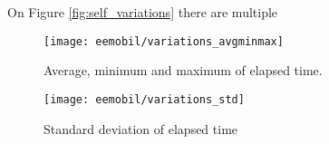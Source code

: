 		On Figure \ref{fig:self_variations} there are multiple 
		\begin{figure}
			\centering
			\texttt{[image: eemobil/variations\_avgminmax]}
			\caption{Average, minimum and maximum of elapsed time.}
			\label{fig:self_variations_avgminmax}
		\end{figure}
		\begin{figure}
			\centering
			\texttt{[image: eemobil/variations\_std]}
			\caption{Standard deviation of elapsed time}
			\label{fig:self_variations_std}
		\end{figure}

